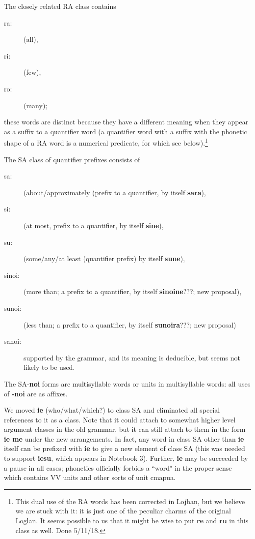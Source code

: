 \documentclass[12pt]{book}
\begin{document}
The closely related RA class contains 

\begin{description}

\item [ra:] (all), 

\item [ri:] (few), 

\item [ro:] (many);

\end{description}

 these words are distinct because they have a different meaning when they appear as a suffix to a quantifier word (a quantifier word with a suffix with the phonetic shape of a RA word  is a numerical predicate, for which see below).\footnote{This dual use of the RA words has been corrected in Lojban, but we believe we are stuck with it:  it is just one of the peculiar charms of the original Loglan.  It seems possible to us that it might be wise to put {\bf re} and {\bf ru} in this class as well. Done 5/11/18.}

The SA class of quantifier prefixes consists of  \begin{description}
\item[sa:] (about/approximately (prefix to a quantifier, by itself {\bf sara}),  
\item[si:] (at most, prefix to a quantifier, by itself {\bf  sine}), 
\item[su:] (some/any/at least (quantifier prefix) by itself {\bf sune}),
\item[sinoi:]  (more than; a prefix to a quantifier, by itself {\bf sinoine}???; new proposal),
\item[sunoi:]  (less than; a prefix to a quantifier, by itself {\bf sunoira}???; new proposal)
\item[sanoi:]  supported by the grammar, and its meaning is deducible, but seems not likely to be used.\end{description}

The SA-{\bf noi} forms are multisyllable words or units in multisyllable words:  all uses of {\bf -noi} are as affixes.

We moved {\bf ie} (who/what/which?) to class SA and eliminated all special references to it as a class.  Note that it could attach to somewhat higher level argument classes in the old grammar, but it can still attach to them in the form {\bf ie me} under the new arrangements.  In fact, any word in class SA other than {\bf ie} itself can be prefixed with {\bf ie} to give a new element of class SA (this was needed to support {\bf iesu}, which appears in Notebook 3).  Further, {\bf ie} may be succeeded by a pause in all cases;  phonetics officially forbids a ``word" in the proper sense which
contains VV units and other sorts of unit cmapua.
\end{document}
